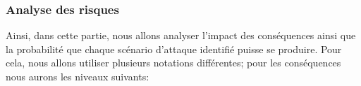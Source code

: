 \begin{table}[H]
	\centering
	\caption{Conséquences des menaces sur l'entreprise}
\end{table}

\subsubsection{Analyse des risques}
Ainsi, dans cette partie, nous allons analyser l'impact des conséquences ainsi que la probabilité que chaque scénario d'attaque identifié puisse se produire. Pour cela, nous allons utiliser plusieurs notations différentes; pour les conséquences nous aurons les niveaux suivants:

